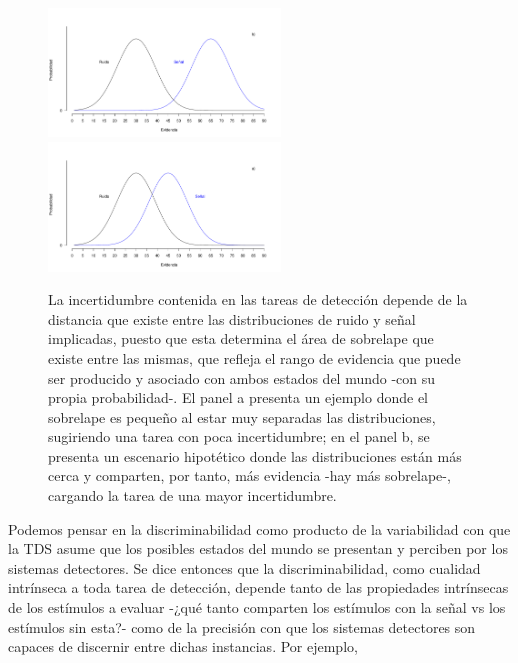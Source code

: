 \begin{figure}[th]
\centering
\includegraphics[width=0.55\textwidth]{Figures/Overlap_Small}\\ 
\includegraphics[width=0.55\textwidth]{Figures/Overlap_Big} 
\caption[El sobrelape Ruido-señal como reflejo de la incertidumbre contenida en las tareas de detección]{La incertidumbre contenida en las tareas de detección depende de la distancia que existe entre las distribuciones de ruido y señal implicadas, puesto que esta determina el área de sobrelape que existe entre las mismas, que refleja el rango de evidencia que puede ser producido y asociado con ambos estados del mundo -con su propia probabilidad-. El panel a presenta un ejemplo donde el sobrelape es pequeño al estar muy separadas las distribuciones, sugiriendo una tarea con poca incertidumbre; en el panel b, se presenta un escenario hipotético donde las distribuciones están más cerca y comparten, por tanto, más evidencia -hay más sobrelape-, cargando la tarea de una mayor incertidumbre.}
\label{fig:Overlap}
\end{figure}

Podemos pensar en la discriminabilidad como producto de la variabilidad con que la TDS asume que los posibles estados del mundo se presentan y perciben por los sistemas detectores. Se dice entonces que la discriminabilidad, como cualidad intrínseca a toda tarea de detección, depende tanto de las propiedades intrínsecas de los estímulos a evaluar -¿qué tanto comparten los estímulos con la señal vs los estímulos sin esta?- como de la precisión con que los sistemas detectores son capaces de discernir entre dichas instancias. Por ejemplo, \\

